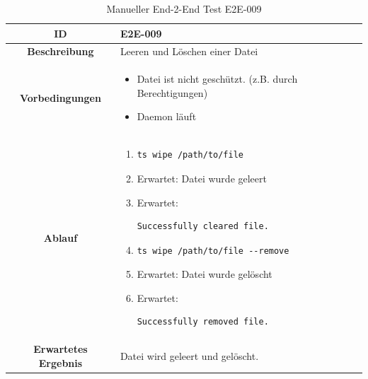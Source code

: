 \documentclass[a4paper,12pt]{report}
\begin{document}
    \begin{table}[h!]
        \centering
        \setlength{\leftmargini}{0.8cm}
        \begin{tabular}{|c|p{10cm}|}
            \hline
            \textbf{ID}           & E2E-009 \\ \hline
            \textbf{Beschreibung} & Leeren und Löschen einer Datei \\ \hline
            \textbf{Vorbedingungen} &
            \begin{itemize}
                \item Datei ist nicht geschützt. (z.B. durch Berechtigungen)
                \item Daemon läuft
            \end{itemize} \\ \hline
            \textbf{Ablauf} &
            \begin{enumerate}
                \item \begin{verbatim}ts wipe /path/to/file\end{verbatim}
                \item Erwartet: Datei wurde geleert
                \item Erwartet: \begin{verbatim}Successfully cleared file.\end{verbatim}
                \item \begin{verbatim}ts wipe /path/to/file --remove\end{verbatim}
                \item Erwartet: Datei wurde gelöscht
                \item Erwartet: \begin{verbatim}Successfully removed file.\end{verbatim}
            \end{enumerate} \\ \hline
            \textbf{Erwartetes Ergebnis} & Datei wird geleert und gelöscht. \\ \hline
        \end{tabular}
        \caption{Manueller End-2-End Test E2E-009}\label{tab:e2e-9}
    \end{table}
\end{document}
